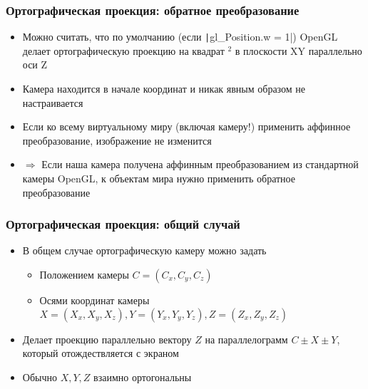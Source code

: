 \documentclass[10pt]{beamer}
\begin{document}
\begin{frame}[fragile]
\frametitle{Ортографическая проекция: обратное преобразование}
\begin{itemize}
\item Можно считать, что по умолчанию (если \texttt|gl_Position.w = 1|) OpenGL делает ортографическую проекцию на квадрат \begin{math}[-1, 1]^2\end{math} в плоскости XY параллельно оси Z
\pause
\item Камера находится в начале координат и никак явным образом не настраивается
\pause
\item Если ко всему виртуальному миру (включая камеру!) применить аффинное преобразование, изображение не изменится
\pause
\item \begin{math}\Longrightarrow\end{math} Если наша камера получена аффинным преобразованием из стандартной камеры OpenGL, к объектам мира нужно применить обратное преобразование
\end{itemize}
\end{frame}

\begin{frame}[fragile]
\frametitle{Ортографическая проекция: общий случай}
\begin{itemize}
\item В общем случае ортографическую камеру можно задать
\pause
\begin{itemize}
\item Положением камеры \begin{math}C = (C_x, C_y, C_z)\end{math}
\pause
\item Осями координат камеры \begin{math}X = (X_x, X_y, X_z), Y = (Y_x, Y_y, Y_z), Z = (Z_x, Z_y, Z_z)\end{math}
\end{itemize}
\pause
\item Делает проекцию параллельно вектору \begin{math}Z\end{math} на параллелограмм \begin{math}C \pm X \pm Y\end{math}, который отождествляется с экраном
\pause
\item Обычно \begin{math}X, Y, Z\end{math} взаимно ортогональны
\end{itemize}
\end{frame}
\end{document}
